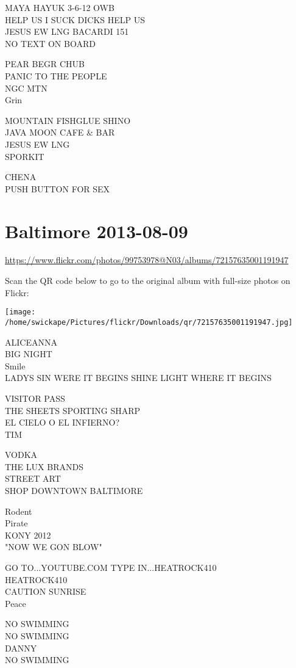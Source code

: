 \documentclass[10pt,letterpaper]{article}
\begin{document}
MAYA HAYUK 3{-}6{-}12 OWB\\
HELP US I SUCK DICKS HELP US\\
JESUS EW LNG BACARDI 151\\
NO TEXT ON BOARD

PEAR BEGR CHUB\\
PANIC TO THE PEOPLE\\
NGC MTN\\
Grin

MOUNTAIN FISHGLUE SHINO\\
JAVA MOON CAFE \& BAR\\
JESUS EW LNG\\
SPORKIT

CHENA\\
PUSH BUTTON FOR SEX


\section*{Baltimore 2013-08-09}

\url{https://www.flickr.com/photos/99753978@N03/albums/72157635001191947}

Scan the QR code below to go to the original album with full-size photos on Flickr:

\texttt{[image: /home/swickape/Pictures/flickr/Downloads/qr/72157635001191947.jpg]}


ALICEANNA\\
BIG NIGHT\\
Smile\\
LADYS SIN WERE IT BEGINS SHINE LIGHT WHERE IT BEGINS

VISITOR PASS\\
THE SHEETS SPORTING SHARP\\
EL CIELO O EL INFIERNO?\\
TIM

VODKA\\
THE LUX BRANDS\\
STREET ART\\
SHOP DOWNTOWN BALTIMORE

Rodent\\
Pirate\\
KONY 2012\\
"NOW WE GON BLOW"

GO TO...YOUTUBE.COM TYPE IN...HEATROCK410\\
HEATROCK410\\
CAUTION SUNRISE\\
Peace

NO SWIMMING\\
NO SWIMMING\\
DANNY\\
NO SWIMMING
\end{document}
